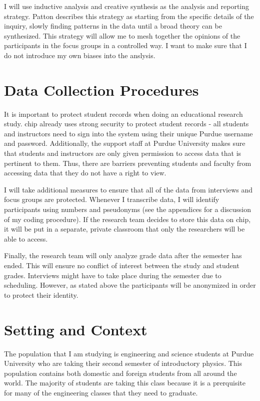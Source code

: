 I will use inductive analysis and creative synthesis as the analysis and reporting strategy. Patton describes this strategy as starting from the specific details of the inquiry, slowly finding patterns in the data until a broad theory can be synthesized\cite{patton2015}. This strategy will allow me to mesh together the opinions of the participants in the focus groups in a controlled way. I want to make sure that I do not introduce my own biases into the anslysis.

\section{Data Collection Procedures}

It is important to protect student records when doing an educational research study. \gls{chip} already uses strong security to protect student records - all students and instructors need to sign into the system using their unique Purdue username and password. Additionally, the support staff at Purdue University makes sure that students and instructors are only given permission to access data that is pertinent to them. Thus, there are barriers preventing students and faculty from accessing data that they do not have a right to view.

I will take additional measures to ensure that all of the data from interviews and focus groups are protected. Whenever I transcribe data, I will identify participants using numbers and pseudonyms (see the appendices for a discussion of my coding procedure). If the research team decides to store this data on \gls{chip}, it will be put in a separate, private classroom that only the researchers will be able to access.

Finally, the research team will only analyze grade data after the semester has ended. This will ensure no conflict of interest between the study and student grades. Interviews might have to take place during the semester due to scheduling. However, as stated above the participants will be anonymized in order to protect their identity.

\section{Setting and Context}

The population that I am studying is engineering and science students at Purdue University who are taking their second semester of introductory physics. This population contains both domestic and foreign students from all around the world. The majority of students are taking this class because it is a prerquisite for many of the engineering classes that they need to graduate.

